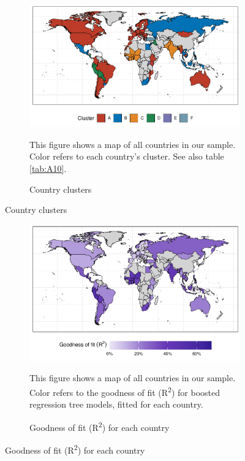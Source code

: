 \begin{figure}[ht!]
  \centering
  \caption{Overview of countries} \label{fig:Map}
  \begin{subfigure}[b]{\textwidth}
  \centering
  \includegraphics{1_Figures/Figures_Appendix/Figure_Maps_1.pdf}
  \caption{Country clusters} \label{fig:Map_1}
  \begin{subcaption2}
    This figure shows a map of all countries in our sample. Color refers to each country's cluster. See also table \ref{tab:A10}.
  \end{subcaption2}
  \end{subfigure}
\end{figure}

\begin{figure}[ht!]\ContinuedFloat
   \begin{subfigure}[b]{\textwidth}
  \centering
  \includegraphics{1_Figures/Figures_Appendix/Figure_Maps_2.pdf}
  \caption{Goodness of fit (R\textsuperscript{2}) for each country} \label{fig:Map_2}
  \begin{subcaption2}
    This figure shows a map of all countries in our sample. Color refers to the goodness of fit (R\textsuperscript{2}) for boosted regression tree models, fitted for each country.
  \end{subcaption2}
\end{subfigure}
\end{figure}


